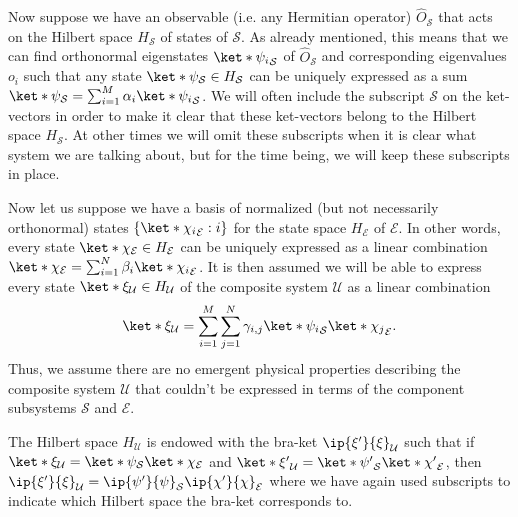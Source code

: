 \documentclass[12pt]{report}
\begin{document}
Now suppose we have an observable (i.e. any Hermitian operator) $\hat{O}_{\mathcal{S}}$  %
%
that acts on the Hilbert space $H_\mathcal{S}$  %
%
of states of $\mathcal{S}$. As already mentioned, this means that we can find orthonormal eigenstates $\ket*{\psi_i}_\mathcal{S}$ of $\hat{O}_{\mathcal{S}}$ and corresponding eigenvalues $o_i$ such that any state $\ket*{\psi}_\mathcal{S}\in H_\mathcal{S}$ can be uniquely expressed as a sum $\ket*{\psi}_\mathcal{S}=\sum_{i=1}^M\alpha_i\ket*{\psi_i}_\mathcal{S}$. We will often include the subscript $\mathcal{S}$ on the ket-vectors in order to make it clear that these ket-vectors belong to the Hilbert space $H_\mathcal{S}$. At other times we will omit these subscripts when it is clear what system we are talking about, but for the time being, we will keep these subscripts in place.

      Now let us suppose we have a basis of normalized (but not necessarily orthonormal) states $\{\ket*{\chi_i}_\mathcal{E}:i\}$ for the state space $H_\mathcal{E}$ of $\mathcal{E}$. In other words, every state $\ket*{\chi}_\mathcal{E}\in H_\mathcal{E}$ can be uniquely expressed as a linear combination $\ket*{\chi}_\mathcal{E}=\sum_{i=1}^N\beta_i\ket*{\chi_i}_\mathcal{E}$. It is then assumed we will be able to express every state $\ket*{\xi}_\mathcal{U}\in H_\mathcal{U}$ of the composite system $\mathcal{U}$ as a linear combination
      \begin{equation}\label{entangled}\ket*{\xi}_\mathcal{U}=\sum_{i=1}^M\sum_{j=1}^N\gamma_{i,j}\ket*{\psi_i}_\mathcal{S}\ket*{\chi_j}_\mathcal{E}.
      \end{equation}
      Thus, we assume there are no emergent physical properties describing the composite system $\mathcal{U}$ that couldn't be expressed in terms of the component subsystems $\mathcal{S}$ and $\mathcal{E}$. %

      The Hilbert space $H_{\mathcal{U}}$ is  endowed with the bra-ket $\ip{\xi'}{\xi}_\mathcal{U}$ such that if $\ket*{\xi}_\mathcal{U}=\ket*{\psi}_\mathcal{S}\ket*{\chi}_\mathcal{E}$ and $\ket*{\xi'}_\mathcal{U}=\ket*{\psi'}_\mathcal{S}\ket*{\chi'}_\mathcal{E}$, then $\ip{\xi'}{\xi}_\mathcal{U}=\ip{\psi'}{\psi}_\mathcal{S}\ip{\chi'}{\chi}_\mathcal{E}$ where we have again used subscripts to indicate which Hilbert space the bra-ket corresponds to. 
\end{document}
